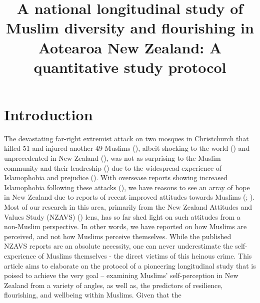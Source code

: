 \documentclass[
  man,
  longtable,
  nolmodern,
  notxfonts,
  notimes,
  colorlinks=true,linkcolor=blue,citecolor=blue,urlcolor=blue]{apa7}
\title{A national longitudinal study of Muslim diversity and flourishing
in Aotearoa New Zealand: A quantitative study protocol}
\begin{document}
\maketitle


\setcounter{secnumdepth}{-\maxdimen} %

\setlength\LTleft{0pt}


\section{Introduction}\label{sec-intro}

The devastating far-right extremist attack on two mosques in
Christchurch that killed 51 and injured another 49 Muslims
(), albeit shocking to the world
() and unprecedented in New Zealand
(), was not as surprising to the Muslim
community and their leadreship ()
due to the widespread experience of Islamophobia and prejudice
(). With oversease reports
showing increased Islamophobia following these attacks
(), we have
reasons to see an array of hope in New Zealand due to reports of recent
improved attitudes towards Muslims (; ). Most
of our research in this area, primarily from the New Zealand Attitudes
and Values Study (NZAVS) () lens, has so far shed light on such
attitudes from a non-Muslim perspective. In other words, we have
reported on how Muslims are perceived, and not how Muslims perceive
themselves. While the published NZAVS reports are an absolute necessity,
one can never underestimate the self-experience of Muslims themselves -
the direct victims of this heinous crime. This article aims to elaborate
on the protocol of a pioneering longitudinal study that is poised to
achieve the very goal -- examining Muslims' self-perception in New
Zealand from a variety of angles, as well as, the predictors of
resilience, flourishing, and wellbeing within Muslims. Given that the
\end{document}
